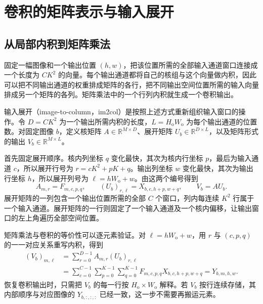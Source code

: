 \section{卷积的矩阵表示与输入展开}
\label{l11:sec:matrix}

\subsection{从局部内积到矩阵乘法}
\label{l11:subsec:matrix_equivalence}

固定一幅图像和一个输出位置 $(h,w)$，把该位置所需的全部输入通道窗口连接成一个长度为 $CK^2$ 的向量。每个输出通道都将自己的核组与这个向量做内积，因此可以把不同输出通道的权重排成矩阵的各行，把不同输出空间位置所需的输入向量排成另一个矩阵的各列。矩阵乘法中的一个行列内积就生成一个卷积输出。

输入展开（image-to-column，im2col）是按照上述方式重新组织输入窗口的操作。令 $D=CK^2$ 为一个输出所需内积的长度，$L=H_{\mathrm{o}}W_{\mathrm{o}}$ 为每个输出通道的位置数。对固定图像 $b$，定义核矩阵 $A\in\mathbb{R}^{M\times D}$、展开矩阵 $U_b\in\mathbb{R}^{D\times L}$，以及矩阵形式的输出 $V_b\in\mathbb{R}^{M\times L}$。

首先固定展开顺序。核内列坐标 $q$ 变化最快，其次为核内行坐标 $p$，最后为输入通道 $c$，所以展开行号为 $r=cK^2+pK+q$。输出列坐标 $w$ 变化最快，其次为输出行坐标 $h$，所以展开列号为 $\ell=hW_{\mathrm{o}}+w$。由这两个编号得到
\begin{equation}
  A_{m,r}=F_{m,c,p,q},
  \qquad
  (U_b)_{r,\ell}=X_{b,c,h+p,w+q},
  \qquad
  V_b=AU_b.
  \label{l11:eq:matrix_mapping}
\end{equation}
展开矩阵的一列包含一个输出位置所需的全部 $C$ 个窗口，列内每连续 $K^2$ 行属于一个输入通道。展开矩阵的一行则固定了一个输入通道及一个核内偏移，让输出窗口的左上角遍历全部空间位置。

矩阵乘法与卷积的等价性可以逐元素验证。对 $\ell=hW_{\mathrm{o}}+w$，用 $r$ 与 $(c,p,q)$ 的一一对应关系重写内积，得到
\begin{equation}
\begin{aligned}
  (V_b)_{m,\ell}
  &=\sum_{r=0}^{D-1}A_{m,r}(U_b)_{r,\ell}\\
  &=\sum_{c=0}^{C-1}\sum_{p=0}^{K-1}\sum_{q=0}^{K-1}
    F_{m,c,p,q}X_{b,c,h+p,w+q}
   =Y_{b,m,h,w}.
\end{aligned}
\label{l11:eq:matrix_proof}
\end{equation}
恢复卷积输出时，只需把 $V_b$ 的每一行按 $H_{\mathrm{o}}\times W_{\mathrm{o}}$ 解释。若 $V_b$ 按行连续存储，其内部顺序与对应图像的 $Y_{b,:,:,:}$ 已经一致，这一步不需要再搬运元素。

